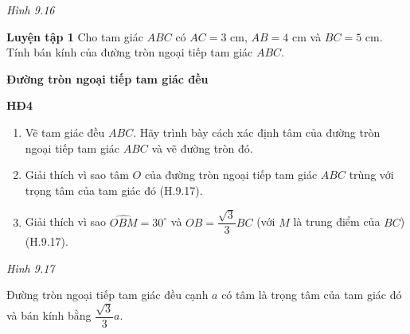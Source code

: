 \begin{lesson}
\begin{center}
    \textit{Hình 9.16}
    \end{center}

    \textbf{Luyện tập 1} Cho tam giác $ABC$ có $AC=3$ cm, $AB=4$ cm và $BC=5$ cm. Tính bán kính của đường tròn ngoại tiếp tam giác $ABC$.

    \answerline
    \answerline

    \textbf{Đường tròn ngoại tiếp tam giác đều}

    \textbf{HĐ4}
    \begin{enumerate}[label=\alph*)]
        \item Vẽ tam giác đều $ABC$. Hãy trình bày cách xác định tâm của đường tròn ngoại tiếp tam giác $ABC$ và vẽ đường tròn đó.

        \answerline
        \answerline
        \item Giải thích vì sao tâm $O$ của đường tròn ngoại tiếp tam giác $ABC$ trùng với trọng tâm của tam giác đó (H.9.17).

        \answerline
        \answerline
        \item Giải thích vì sao $\widehat{OBM}=30^\circ$ và $OB=\dfrac{\sqrt3}{3}BC$ (với $M$ là trung điểm của $BC$) (H.9.17).

        \answerline
        \answerline
    \end{enumerate}

    \begin{center}

    \textit{Hình 9.17}
    \end{center}

    \begin{keyconcept}
        Đường tròn ngoại tiếp tam giác đều cạnh $a$ có tâm là trọng tâm của tam giác đó và bán kính bằng $\dfrac{\sqrt3}{3}a$.
    \end{keyconcept}


\end{lesson}
